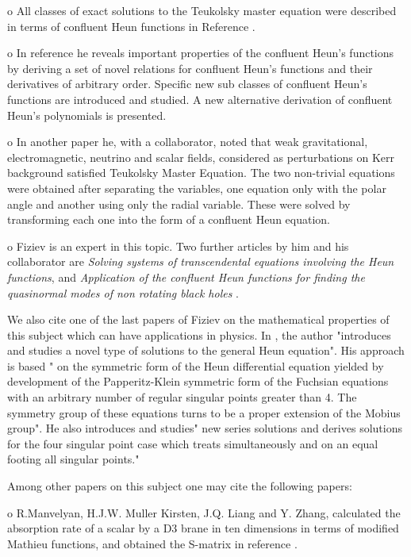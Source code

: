 \documentclass{article}
\begin{document}
o All classes of exact solutions to the Teukolsky master equation
were described in terms of confluent Heun functions in Reference
\cite {fiziev5} \cite{Denitza}.


o In reference \cite {fiziev4} he reveals important properties of
the confluent Heun's functions by deriving a set of novel
relations for confluent Heun's functions and their derivatives of
arbitrary order. Specific new sub classes of confluent Heun's
functions are introduced and studied. A new alternative derivation
of confluent Heun's polynomials is presented.


o In another paper \cite{fiziev7} he, with a collaborator, noted
that weak gravitational, electromagnetic, neutrino and scalar
fields, considered as perturbations on Kerr background satisfied
Teukolsky Master Equation. The two non-trivial equations were
obtained after separating the variables, one equation only with
the polar angle and another using only the radial variable. These
were solved by transforming each one into the form of a confluent
Heun equation.


o Fiziev is an expert in this topic. Two further articles by him
and his collaborator are \emph{ Solving systems of transcendental
equations involving the Heun functions}, \cite{fiziev8} and
\emph{Application of the confluent Heun functions for finding the
quasinormal modes of non rotating black holes} \cite{fiziev9}.

We also cite one of the last papers of Fiziev on the mathematical
properties of this  subject which can have applications in
physics. In \cite{fiziev111}, the author "introduces and studies a
novel type of solutions to the general Heun equation". His approach
is based " on the symmetric form of the Heun differential equation
yielded by development of the Papperitz-Klein symmetric form of
the Fuchsian equations with an arbitrary number  of regular
singular points greater than 4. The symmetry group of these
equations turns to be a proper extension of the Mobius group". He
also introduces and studies" new series solutions   and
derives solutions for the four singular point case which treats
simultaneously and on an equal footing all singular points."

\noindent Among other papers on this subject one may cite the
following papers:


o R.Manvelyan, H.J.W. Muller Kirsten, J.Q. Liang and Y. Zhang,
calculated the absorption rate of a scalar by a D3 brane in ten
dimensions in terms of modified Mathieu functions, and obtained
the S-matrix in reference \cite{manvelyan}.
\end{document}
